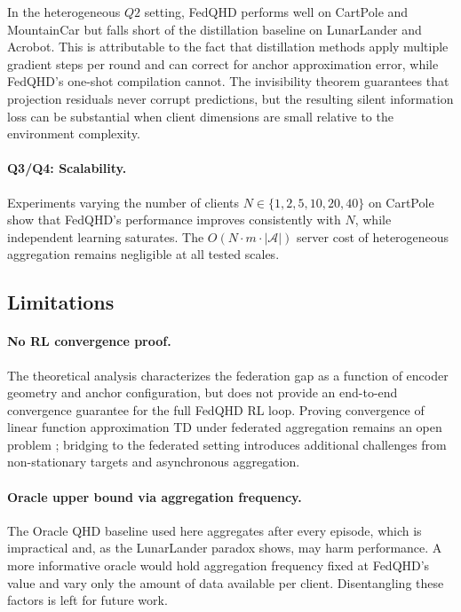In the heterogeneous $Q2$ setting, FedQHD performs well on CartPole and MountainCar but falls short of the distillation baseline on LunarLander and Acrobot. This is attributable to the fact that distillation methods apply multiple gradient steps per round and can correct for anchor approximation error, while FedQHD's one-shot compilation cannot. The invisibility theorem guarantees that projection residuals never corrupt predictions, but the resulting silent information loss can be substantial when client dimensions are small relative to the environment complexity.

\paragraph{Q3/Q4: Scalability.}
Experiments varying the number of clients $N \in \{1, 2, 5, 10, 20, 40\}$ on CartPole show that FedQHD's performance improves consistently with $N$, while independent learning saturates. The $O(N \cdot m \cdot |\mathcal{A}|)$ server cost of heterogeneous aggregation remains negligible at all tested scales.

\subsection{Limitations}
\label{subsec:limitations}

\paragraph{No RL convergence proof.}
The theoretical analysis characterizes the federation gap as a function of encoder geometry and anchor configuration, but does not provide an end-to-end convergence guarantee for the full FedQHD RL loop. Proving convergence of linear function approximation TD under federated aggregation remains an open problem \citep{baird1995residual,tsitsiklis1997analysis}; bridging to the federated setting introduces additional challenges from non-stationary targets and asynchronous aggregation.

\paragraph{Oracle upper bound via aggregation frequency.}
The Oracle QHD baseline used here aggregates after every episode, which is impractical and, as the LunarLander paradox shows, may harm performance. A more informative oracle would hold aggregation frequency fixed at FedQHD's value and vary only the amount of data available per client. Disentangling these factors is left for future work.

